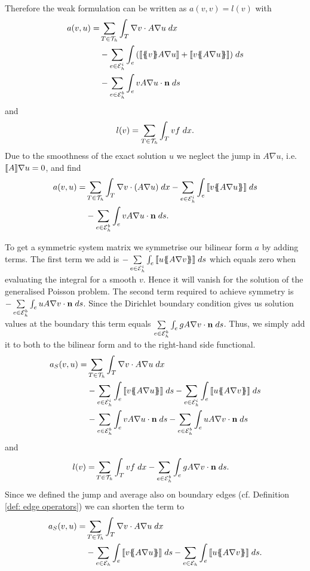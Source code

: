 Therefore the weak formulation can be written as $a(v,v) = l(v)$ with 
\begin{align*}
  a(v, u) = & \sum\limits_{T \in \triang} \myIntX  T { \nabla v \cdot A \nabla u} \\
	& - \sum\limits_{e \in \edgesi}\myIntS {e} {\left( \jump {\average v A \nabla u} + \jump {v \average{ A \nabla u}} \right)}\\
& - \sum\limits_{e \in \edgesb}\myIntS {e} {v A \nabla u \cdot \mathbf n}
\end{align*}
and
\[
l(v) = \sum_{T \in \mathcal{T}_h} \int_{T} {{ v f}\;dx}.
\]
Due to the smoothness of the exact solution $u$ we neglect the jump in $A \nabla u$, i.e. $\llbracket A \rrbracket \nabla u =0$, and find
\begin{align*}
 a(v, u) = & \sum\limits_{T \in \triang} \myIntX  T { \nabla v \cdot \left(A \nabla u\right)} %
	- \sum\limits_{e \in \edgesi} \myIntS e {\jump{ v \average{ A \nabla u}}} %
	\\
& - \sum\limits_{e \in \edgesb}\myIntS e { v A \nabla u \cdot \mathbf n}.
\end{align*}

To get a symmetric system matrix we symmetrise our bilinear form $a$ by adding terms. 
The first term we add is  $- \sum\limits_{e \in \mathcal{E}_h^i}\int_{e} {{ \llbracket  u \{\!\!\{  A \nabla v \}\!\!\} \rrbracket}\;ds}$ which equals zero when evaluating the integral for a smooth $v$. Hence it will vanish for the solution of the generalised Poisson problem. The second term required to achieve symmetry is  $-\sum\limits_{e \in \mathcal{E}_h^b}\int_{e} {{ u A \nabla v \cdot \mathbf n}\;ds}$. Since the Dirichlet boundary condition gives us solution values at the boundary this term equals $\sum\limits_{e \in \mathcal{E}_h^b}\int_{e} {{ g A \nabla v \cdot \mathbf n}\;ds}$. Thus, we simply add it to both to the bilinear form and to the right-hand side functional.
\begin{align}
 a_S(v, u) = &\sum\limits_{T \in \triang} \myIntX  T { \nabla v \cdot A \nabla u} \nonumber \\
  &-\sum\limits_{e \in \edgesi}\myIntS e { \jump {v \average{A \nabla u} }}
 - \sum\limits_{e \in \edgesi}\myIntS e { \jump{ u \average{ A \nabla v}}} \nonumber\\ 
 & - \sum\limits_{e \in \edgesb}\myIntS e { v A \nabla u \cdot \mathbf n} 
    - \sum\limits_{e \in \edgesb}\myIntS e { u A \nabla v \cdot \mathbf n} \nonumber
\end{align}
and 
\begin{align}
	l(v) =& \sum\limits_{T \in \mathcal{T}_h} \int_{T} {{ v f}\;dx}
		 -\sum\limits_{e \in \mathcal{E}_h^b}\int_{e} {{ g A \nabla v \cdot \mathbf n}\;ds}.
\end{align} 
Since we defined the jump and average also on boundary edges (cf. Definition \ref{def: edge operators}) we can shorten the term to 
\begin{align}
a_S(v, u)= &\sum\limits_{T \in \triang} \myIntX  T { \nabla v \cdot A \nabla u} \nonumber \\  &-\sum\limits_{e \in \edges}\myIntS e { \jump {v \average{A \nabla u} }}
 - \sum\limits_{e \in \edges}\myIntS e { \jump{ u \average{ A \nabla v}}}. \label{eq:inner product SIPG}
\end{align}

